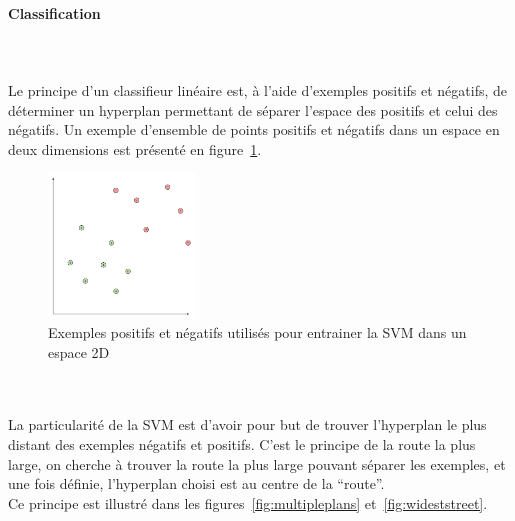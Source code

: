 \documentclass[12pt]{article}
\begin{document}
\paragraph{Classification}~\\
\\
Le principe d'un classifieur linéaire est, à l'aide d’exemples positifs et négatifs, de déterminer un hyperplan permettant de séparer l'espace des positifs et celui des négatifs. Un exemple d'ensemble de points positifs et négatifs dans un espace en deux dimensions est présenté en figure~\ref{fig:trainingexamples}.
\begin{figure}[!ht]
    \centering
	    \includegraphics[width=0.35\textwidth]{img/trainingexamples.png}
	    \caption{Exemples positifs et négatifs utilisés pour entrainer la SVM dans un espace 2D}
        \label{fig:trainingexamples}
\end{figure}
\\\\
La particularité de la SVM est d'avoir pour but de trouver l'hyperplan le plus distant des exemples négatifs et positifs. C'est le principe de la route la plus large, on cherche à trouver la route la plus large pouvant séparer les exemples, et une fois définie, l'hyperplan choisi est au centre de la ``route''.\\
Ce principe est illustré dans les figures~\ref{fig:multipleplans} et~\ref{fig:wideststreet}.
\end{document}

